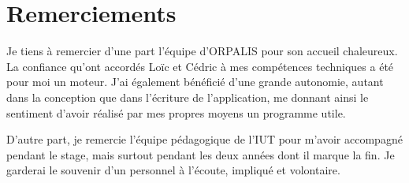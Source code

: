 \chapter*{Remerciements}
\thispagestyle{empty}

Je tiens à remercier d'une part l'équipe d'ORPALIS pour son accueil chaleureux. La confiance qu'ont accordés Loïc et Cédric à mes compétences techniques a été pour moi un moteur. J'ai également bénéficié d'une grande autonomie, autant dans la conception que dans l'écriture de l'application, me donnant ainsi le sentiment d'avoir réalisé par mes propres moyens un programme utile.

D'autre part, je remercie l'équipe pédagogique de l'IUT pour m'avoir accompagné pendant le stage, mais surtout pendant les deux années dont il marque la fin. Je garderai le souvenir d'un personnel à l'écoute, impliqué et volontaire.